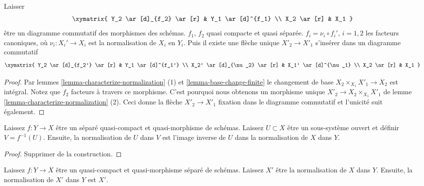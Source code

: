 \begin{lemma}

\label{lemma-functoriality-normalization}

Laisser
$$
\xymatrix{
Y_2 \ar[d]_{f_2} \ar[r] & Y_1 \ar[d]^{f_1} \\
X_2 \ar[r] & X_1
}
$$
être un diagramme commutatif des morphismes des schémas. $f_1$, $f_2$ quasi compacte et quasi séparée. $f_i = \nu_i \circ f_i'$, $i = 1, 2$
les facteurs canoniques, où $\nu_i : X_i' \to X_i$ est la normalisation de $X_i$ en $Y_i$. Puis il existe une flèche unique $X'_2 \to X'_1$ s'insérer dans un diagramme commutatif
$$
\xymatrix{
Y_2 \ar[d]_{f_2'} \ar[r] & Y_1 \ar[d]^{f_1'} \\
X_2' \ar[d]_{\nu_2} \ar[r] & X_1' \ar[d]^{\nu_1} \\
X_2 \ar[r] & X_1
}
$$

\end{lemma}

\begin{proof}
Par lemmes \ref{lemma-characterize-normalization} (1) et \ref{lemma-base-change-finite} le changement de base $X_2 \times_{X_1} X'_1 \to X_2$ est intégral. Notez que $f_2$ facteurs à travers ce morphisme. C'est pourquoi nous obtenons un morphisme unique $X'_2 \to X_2 \times_{X_1} X'_1$ de lemme \ref{lemma-characterize-normalization} (2). Ceci donne la flèche $X'_2 \to X'_1$ fixation dans le diagramme commutatif et l'unicité suit également.
\end{proof}

\begin{lemma}

\label{lemma-normalization-localization}
Laissez $f : Y \to X$ être un séparé quasi-compact et quasi-morphisme de schémas. Laissez $U \subset X$ être un sous-système ouvert et définir $V = f^{-1}(U)$. Ensuite, la normalisation de $U$ dans $V$ est l'image inverse de $U$ dans la normalisation de $X$ dans $Y$.
\end{lemma}

\begin{proof}
Supprimer de la construction.
\end{proof}

\begin{lemma}

\label{lemma-normalization-is-normalization}
Laissez $f : Y \to X$ être un quasi-compact et quasi-morphisme séparé de schémas. Laissez $X'$ être la normalisation de $X$ dans $Y$. Ensuite, la normalisation de $X'$ dans $Y$ est $X'$.
\end{lemma}

